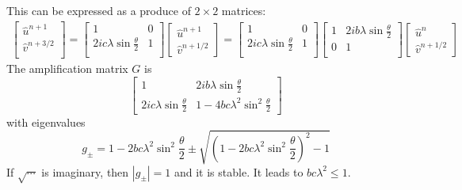 This can be expressed as a produce of $2\times2$ matrices:
\begin{gather}
\begin{bmatrix}
        \hat{u}^{n+1}\\
        \hat{v}^{n+3/2}\\
\end{bmatrix}
=\begin{bmatrix}
  1 & 0\\
  2ic\lambda\sin\frac{\theta}{2} & 1\\
 \end{bmatrix}
 \begin{bmatrix}
  \hat{u}^{n+1}\\
  \hat{v}^{n+1/2}
 \end{bmatrix}
=\begin{bmatrix}
  1 & 0\\
  2ic\lambda\sin\frac{\theta}{2} & 1\\
 \end{bmatrix}
 \begin{bmatrix}
  1 &2ib\lambda\sin\frac{\theta}{2}\\
  0 & 1\\
 \end{bmatrix}
 \begin{bmatrix}
  \hat{u}^n\\
  \hat{v}^{n+1/2}
 \end{bmatrix}
\end{gather}
The amplification matrix $G$ is
\begin{equation}
\begin{bmatrix}
 1 & 2ib\lambda\sin\frac{\theta}{2}\\
 2ic\lambda\sin\frac{\theta}{2} &1-4bc\lambda^2\sin^2\frac{\theta}{2}
\end{bmatrix}
\end{equation}
with eigenvalues
\begin{equation}
 g_{\pm}=1-2bc\lambda^2\sin^2\frac{\theta}{2}\pm\sqrt{\left(1-2bc\lambda^2\sin^2\frac{\theta}{2} \right)^2-1}
\end{equation}
If $\sqrt{\cdots}$ is imaginary, then $|g_{\pm}|=1$ and it is stable. It leads to $bc\lambda^2\leq 1$.

